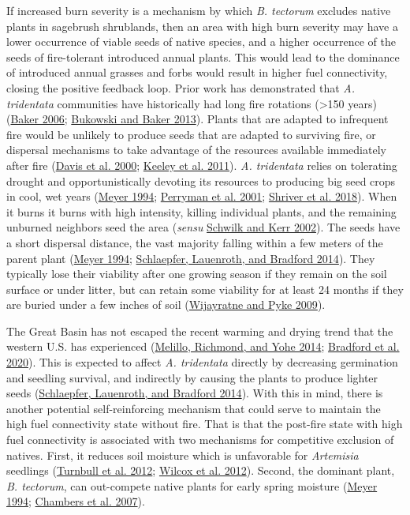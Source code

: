 \documentclass[
  12pt,
]{article}
\begin{document}
If increased burn severity is a mechanism by which \emph{B. tectorum}
excludes native plants in sagebrush shrublands, then an area with high
burn severity may have a lower occurrence of viable seeds of native
species, and a higher occurrence of the seeds of fire-tolerant
introduced annual plants. This would lead to the dominance of introduced
annual grasses and forbs would result in higher fuel connectivity,
closing the positive feedback loop. Prior work has demonstrated that
\emph{A. tridentata} communities have historically had long fire
rotations (\textgreater150 years)
(\protect\hyperlink{ref-Baker2006}{Baker 2006};
\protect\hyperlink{ref-Bukowski2013}{Bukowski and Baker 2013}). Plants
that are adapted to infrequent fire would be unlikely to produce seeds
that are adapted to surviving fire, or dispersal mechanisms to take
advantage of the resources available immediately after fire
(\protect\hyperlink{ref-Davis2000}{Davis et al. 2000};
\protect\hyperlink{ref-Keeley2011}{Keeley et al. 2011}). \emph{A.
tridentata} relies on tolerating drought and opportunistically devoting
its resources to producing big seed crops in cool, wet years
(\protect\hyperlink{ref-Meyer1994}{Meyer 1994};
\protect\hyperlink{ref-Perryman2001}{Perryman et al. 2001};
\protect\hyperlink{ref-Shriver2018}{Shriver et al. 2018}). When it burns
it burns with high intensity, killing individual plants, and the
remaining unburned neighbors seed the area (\emph{sensu}
\protect\hyperlink{ref-Schwilk2002}{Schwilk and Kerr 2002}). The seeds
have a short dispersal distance, the vast majority falling within a few
meters of the parent plant (\protect\hyperlink{ref-Meyer1994}{Meyer
1994}; \protect\hyperlink{ref-Schlaepfer2014}{Schlaepfer, Lauenroth, and
Bradford 2014}). They typically lose their viability after one growing
season if they remain on the soil surface or under litter, but can
retain some viability for at least 24 months if they are buried under a
few inches of soil (\protect\hyperlink{ref-Wijayratne2009}{Wijayratne
and Pyke 2009}).

The Great Basin has not escaped the recent warming and drying trend that
the western U.S. has experienced
(\protect\hyperlink{ref-Melillo2014}{Melillo, Richmond, and Yohe 2014};
\protect\hyperlink{ref-Bradford2020}{Bradford et al. 2020}). This is
expected to affect \emph{A. tridentata} directly by decreasing
germination and seedling survival, and indirectly by causing the plants
to produce lighter seeds
(\protect\hyperlink{ref-Schlaepfer2014}{Schlaepfer, Lauenroth, and
Bradford 2014}). With this in mind, there is another potential
self-reinforcing mechanism that could serve to maintain the high fuel
connectivity state without fire. That is that the post-fire state with
high fuel connectivity is associated with two mechanisms for competitive
exclusion of natives. First, it reduces soil moisture which is
unfavorable for \emph{Artemisia} seedlings
(\protect\hyperlink{ref-Turnbull2012}{Turnbull et al. 2012};
\protect\hyperlink{ref-Wilcox2012}{Wilcox et al. 2012}). Second, the
dominant plant, \emph{B. tectorum}, can out-compete native plants for
early spring moisture (\protect\hyperlink{ref-Meyer1994}{Meyer 1994};
\protect\hyperlink{ref-Chambers2007}{Chambers et al. 2007}).
\end{document}

